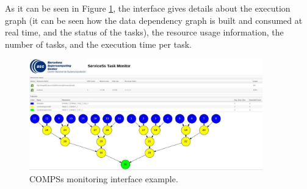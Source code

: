 As it can be seen in Figure \ref{fig:monitoring_interface}, the interface gives details about the execution graph (it can be seen how the data dependency graph is built and consumed at real time, and the status of the tasks), the resource usage information, the number of tasks, and the execution time per task.

\begin{figure}[thb!]
  \centering
    \includegraphics[width=0.9\textwidth]{./Sections/3_Running_Apps/Figures/compss_monitoring.jpeg}
    \caption{COMPSs monitoring interface example. \label{fig:monitoring_interface}}
\end{figure}